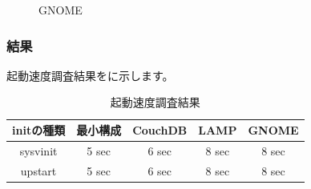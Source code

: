 \documentclass[mingoth,a4paper]{jsarticle}
\begin{document}
\begin{figure}[thbp]
\caption{GNOME}
\end{figure}

\clearpage
\subsubsection{結果}
起動速度調査結果をに示します。

\begin{table}[H]
\begin{center}
\caption{起動速度調査結果}
\label{tb:bootchart-check}
\begin{tabular}{|c|c|c|c|c|}\hline
initの種類 & 最小構成&
 CouchDB & LAMP & GNOME \\
\hline\hline
sysvinit & 5 sec & 6 sec & 8 sec & 8 sec \\
\hline
upstart & 5 sec & 6 sec & 8 sec & 8 sec \\
\hline
\end{tabular}
\end{center}
\end{table}
\end{document}
